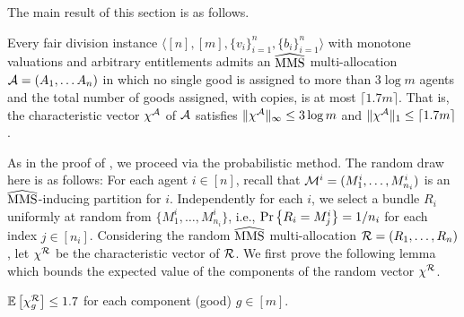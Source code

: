 The main result of this section is as follows.

\begin{theorem}
\label{thm:mms_hat_monotone_goods}
        Every fair division instance $\langle [n], [m], \{v_i\}_{i=1}^n, \{b_i\}_{i=1}^n \rangle$ with monotone valuations and arbitrary entitlements admits an $\widehat{\mathrm{MMS}}$ multi-allocation $\mathcal{A} = (A_1,\ldots A_n)$ in which no single good is assigned to more than $3 \log m$ agents and the total number of goods assigned, with copies, is at most $\lceil 1.7  m \rceil$. That is, the characteristic vector $\chi^{\mathcal{A}}$ of $\mathcal{A}$ satisfies $\|\chi^{\mathcal{A}}\|_\infty \leq 3 \log m$ and $\|\chi^{\mathcal{A}}\|_1\leq \lceil 1.7 m \rceil$.
\end{theorem}

As in the proof of , we proceed via the probabilistic method. The random draw here is as follows: For each agent $i\in [n]$, recall that $\mathcal{M}^i=(M^i_1,\dots,M^i_{n_i})$ is an $\widehat{\mathrm{MMS}}$-inducing partition for $i$. Independently for each $i$, we select a bundle $R_i$ uniformly at random from $\{M^i_1,\dots,M^i_{n_i}\}$, i.e., $\Pr \left\{R_i = M^i_j\right\}=1/n_i$ for each index $j\in [n_i]$. Considering the random $\widehat{\mathrm{MMS}}$ multi-allocation $\mathcal{R}=(R_1,\dots,R_n)$, let $\chi^{\mathcal{R}}$ be the characteristic vector of $\mathcal{R}$. We first prove the following lemma which bounds the expected value of the components of the random vector $\chi^{\mathcal{R}}$.

\begin{lemma}
    $\mathbb{E}\left[\chi^{\mathcal{R}}_g\right] \leq 1.7$ for each component (good) $g \in [m]$. \label{lem:expval-entitlements}
\end{lemma}

